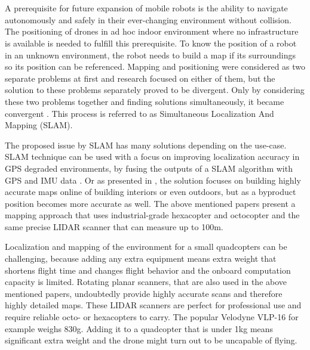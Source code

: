 \chapter{\bevezetes}





A prerequisite for future expansion of mobile robots is the ability to navigate autonomously and safely in their ever-changing
environment without collision. The positioning of drones in ad hoc indoor environment where no infrastructure is available is 
needed to fulfill this prerequisite. To know the position of a robot in an unknown environment, the robot needs to build a map
if its surroundings so its position can be referenced. Mapping and positioning were considered as two separate problems 
at first and research focused on either of them, but the solution to these problems separately proved to be divergent. Only 
by considering these two problems together and finding solutions simultaneously, it became convergent 
\cite{durrant2006simultaneous}. This process is referred to as Simultaneous Localization And Mapping (SLAM).

The proposed issue by SLAM has many solutions depending on the use-case. SLAM technique can be used with a 
focus on improving localization accuracy in GPS degraded environments, by fusing the outputs of a SLAM algorithm with GPS and
IMU data \cite{hening20173d}. Or as presented in \cite{droeschel2018efficient}, the solution focuses on building highly accurate maps
online of building interiors or even outdoors, but as a byproduct position becomes more accurate as well. The above mentioned 
papers present a mapping approach that uses industrial-grade hexacopter and octocopter and the same precise LIDAR scanner that can
measure up to 100m. 

Localization and mapping of the environment for a small quadcopters can be challenging, because adding any extra equipment means
extra weight that shortens flight time and changes flight behavior and the onboard computation capacity is limited. Rotating planar 
scanners, that are also used in the above mentioned papers, undoubtedly provide highly accurate scans and therefore highly detailed maps.
These LIDAR scanners are perfect for professional use and require reliable octo- or hexacopters to carry. 
The popular Velodyne VLP-16 for example weighs 830g. Adding it to a quadcopter that is under 1kg means significant extra weight and the 
drone might turn out to be uncapable of flying. 

